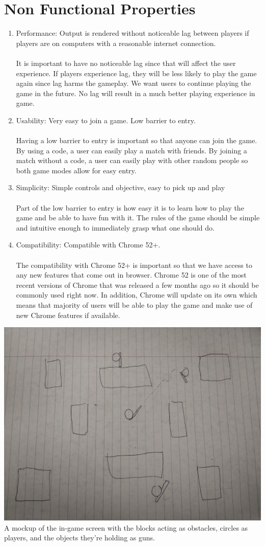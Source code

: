 \documentclass[11pt, oneside]{article}   	%
\begin{document}
\section{Non Functional Properties}
\begin{enumerate}
\item
Performance:  Output is rendered without noticeable lag between players if players are on
computers with a reasonable internet connection. \\\\
It is important to have no noticeable lag since that will affect the user
experience. If players experience lag, they will be less likely to play the
game again since lag harms the gameplay. We want users to continue playing
the game in the future. No lag will result in a much better playing
experience in game.
\item
Usability: Very easy to join a game. Low barrier to entry.\\\\
Having a low barrier to entry is important so that anyone can join the game. By
using a code, a user can easily play a match with friends. By joining a
match without a code, a user can easily play with other random people so
both game modes allow for easy entry.
\item
Simplicity:  Simple controls and objective, easy to pick up and play\\\\
Part of the low barrier to entry is how easy it is to learn how to
play the game and be able to have fun with it.  The rules of the game
should be simple and intuitive enough to immediately grasp what
one should do.
\item
Compatibility: Compatible with Chrome 52+.\\\\
The compatibility with Chrome 52+ is important so that we have access to any
new features that come out in browser. Chrome 52 is one of the most recent
versions of Chrome that was released a few months ago so it should be
commonly used right now. In addition, Chrome will update on its own which
means that majority of users will be able to play the game and make use of
new Chrome features if available.

\end{enumerate}

\clearpage

\includegraphics[scale=.085]{images/mockup.jpg}\\
A mockup of the in-game screen with the blocks acting as obstacles, circles as players, and the objects they're holding as guns.
\end{document}
